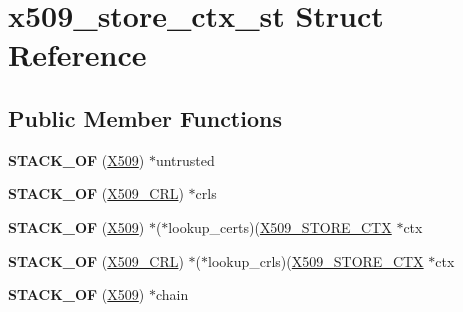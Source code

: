 \hypertarget{structx509__store__ctx__st}{}\section{x509\+\_\+store\+\_\+ctx\+\_\+st Struct Reference}
\label{structx509__store__ctx__st}
\subsection*{Public Member Functions}
\begin{DoxyCompactItemize}
\item 
\mbox{\label{structx509__store__ctx__st_a517077c8ae62ceb22890ccb6a81d25ef}} 
{\bfseries S\+T\+A\+C\+K\+\_\+\+OF} (\hyperlink{structx509__st}{X509}) $\ast$untrusted
\item 
\mbox{\label{structx509__store__ctx__st_ab57fcf4d3e8e33f1f34bc2f50ca9f95b}} 
{\bfseries S\+T\+A\+C\+K\+\_\+\+OF} (\hyperlink{struct_x509__crl__st}{X509\+\_\+\+C\+RL}) $\ast$crls
\item 
\mbox{\label{structx509__store__ctx__st_a8aa85e3cf843718ac7bd414facebeeb3}} 
{\bfseries S\+T\+A\+C\+K\+\_\+\+OF} (\hyperlink{structx509__st}{X509}) $\ast$($\ast$lookup\+\_\+certs)(\hyperlink{structx509__store__ctx__st}{X509\+\_\+\+S\+T\+O\+R\+E\+\_\+\+C\+TX} $\ast$ctx
\item 
\mbox{\label{structx509__store__ctx__st_adb9ab5bd5993b76c920efb93dbfb3983}} 
{\bfseries S\+T\+A\+C\+K\+\_\+\+OF} (\hyperlink{struct_x509__crl__st}{X509\+\_\+\+C\+RL}) $\ast$($\ast$lookup\+\_\+crls)(\hyperlink{structx509__store__ctx__st}{X509\+\_\+\+S\+T\+O\+R\+E\+\_\+\+C\+TX} $\ast$ctx
\item 
\mbox{\label{structx509__store__ctx__st_a364fd53075271cda975dc21f837258d8}} 
{\bfseries S\+T\+A\+C\+K\+\_\+\+OF} (\hyperlink{structx509__st}{X509}) $\ast$chain
\end{DoxyCompactItemize}
